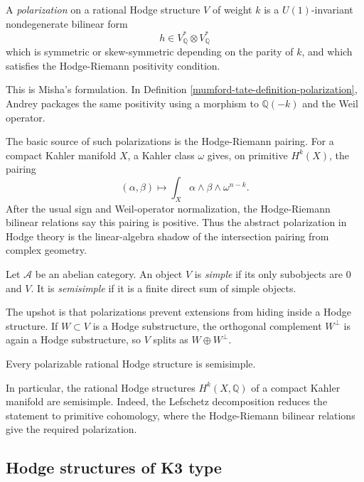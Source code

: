 \begin{definition}
\label{definition-polarization-hodge}
A {\it polarization} on a rational Hodge
structure $V$ of weight $k$ is a
$U(1)$-invariant nondegenerate bilinear form
$$
h\in V_{\mathbb{Q}}^*\otimes
V_{\mathbb{Q}}^*
$$
which is symmetric or skew-symmetric
depending on the parity of $k$, and which
satisfies the Hodge-Riemann positivity
condition.
\end{definition}

\noindent
This is Misha's formulation.
In
Definition
\ref{mumford-tate-definition-polarization},
Andrey packages the same positivity using a
morphism to $\mathbb{Q}(-k)$ and the Weil
operator.

\medskip
The basic source of such polarizations is the
Hodge-Riemann pairing.
For a compact Kahler manifold $X$, a Kahler
class $\omega$ gives, on primitive
$H^k(X)$, the pairing
$$
(\alpha,\beta)\longmapsto
\int_X\alpha\wedge\beta\wedge\omega^{n-k}.
$$
After the usual sign and Weil-operator
normalization, the Hodge-Riemann bilinear
relations say this pairing is positive.
Thus the abstract polarization in Hodge
theory is the linear-algebra shadow of the
intersection pairing from complex geometry.

\begin{definition}
\label{definition-simple-semisimple-object}
Let $\mathcal{A}$ be an abelian category.
An object $V$ is {\it simple} if its only
subobjects are $0$ and $V$.
It is {\it semisimple} if it is a finite
direct sum of simple objects.
\end{definition}

\noindent
The upshot is that polarizations prevent
extensions from hiding inside a Hodge
structure.
If $W\subset V$ is a Hodge substructure, the
orthogonal complement $W^\perp$ is again a
Hodge substructure, so $V$ splits as
$W\oplus W^\perp$.

\begin{proposition}
\label{proposition-polarizable-hs-semisimple}
Every polarizable rational Hodge structure
is semisimple.
\end{proposition}

\noindent
In particular, the rational Hodge structures
$H^k(X,\mathbb{Q})$ of a compact Kahler
manifold are semisimple.
Indeed, the Lefschetz decomposition reduces
the statement to primitive cohomology, where
the Hodge-Riemann bilinear relations give
the required polarization.

\subsection{Hodge structures of K3 type}
\label{subsection-k3-type-hodge-structures}

